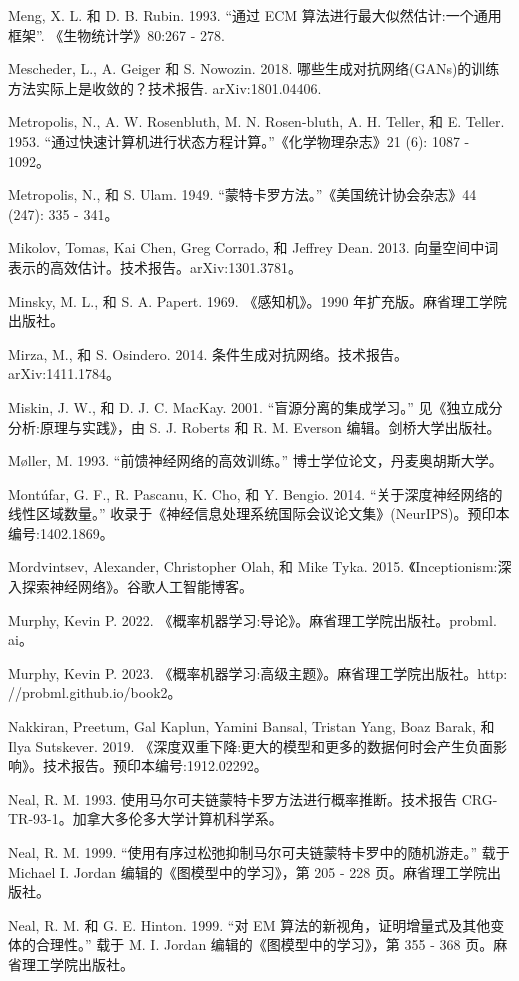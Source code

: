 \documentclass[10pt]{report}
\begin{document}
Meng, X. L. 和 D. B. Rubin. 1993. “通过 ECM 算法进行最大似然估计:一个通用框架”. 《生物统计学》80:267 - 278.

Mescheder, L., A. Geiger 和 S. Nowozin. 2018. 哪些生成对抗网络(GANs)的训练方法实际上是收敛的？技术报告. arXiv:1801.04406.

Metropolis, N., A. W. Rosenbluth, M. N. Rosen-bluth, A. H. Teller, 和 E. Teller. 1953. “通过快速计算机进行状态方程计算。”《化学物理杂志》21 (6): 1087 - 1092。

Metropolis, N., 和 S. Ulam. 1949. “蒙特卡罗方法。”《美国统计协会杂志》44 (247): 335 - 341。

Mikolov, Tomas, Kai Chen, Greg Corrado, 和 Jeffrey Dean. 2013. 向量空间中词表示的高效估计。技术报告。arXiv:1301.3781。

Minsky, M. L., 和 S. A. Papert. 1969. 《感知机》。1990 年扩充版。麻省理工学院出版社。

Mirza, M., 和 S. Osindero. 2014. 条件生成对抗网络。技术报告。arXiv:1411.1784。

Miskin, J. W., 和 D. J. C. MacKay. 2001. “盲源分离的集成学习。” 见《独立成分分析:原理与实践》，由 S. J. Roberts 和 R. M. Everson 编辑。剑桥大学出版社。

Møller, M. 1993. “前馈神经网络的高效训练。” 博士学位论文，丹麦奥胡斯大学。

Montúfar, G. F., R. Pascanu, K. Cho, 和 Y. Bengio. 2014. “关于深度神经网络的线性区域数量。” 收录于《神经信息处理系统国际会议论文集》(NeurIPS)。预印本编号:1402.1869。

Mordvintsev, Alexander, Christopher Olah, 和 Mike Tyka. 2015. 《Inceptionism:深入探索神经网络》。谷歌人工智能博客。

Murphy, Kevin P. 2022. 《概率机器学习:导论》。麻省理工学院出版社。probml. ai。

Murphy, Kevin P. 2023. 《概率机器学习:高级主题》。麻省理工学院出版社。http: //probml.github.io/book2。

Nakkiran, Preetum, Gal Kaplun, Yamini Bansal, Tristan Yang, Boaz Barak, 和 Ilya Sutskever. 2019. 《深度双重下降:更大的模型和更多的数据何时会产生负面影响》。技术报告。预印本编号:1912.02292。

Neal, R. M. 1993. 使用马尔可夫链蒙特卡罗方法进行概率推断。技术报告 CRG-TR-93-1。加拿大多伦多大学计算机科学系。

Neal, R. M. 1999. “使用有序过松弛抑制马尔可夫链蒙特卡罗中的随机游走。” 载于 Michael I. Jordan 编辑的《图模型中的学习》，第 205 - 228 页。麻省理工学院出版社。

Neal, R. M. 和 G. E. Hinton. 1999. “对 EM 算法的新视角，证明增量式及其他变体的合理性。” 载于 M. I. Jordan 编辑的《图模型中的学习》，第 355 - 368 页。麻省理工学院出版社。
\end{document}
